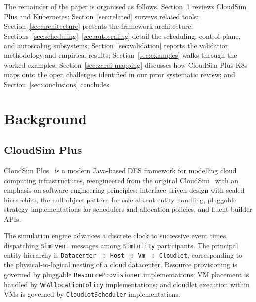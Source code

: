 \documentclass[ASNA,twocolumn]{USG}
\newcommand{\ckm}{CloudSim Plus-K8s\xspace}
\begin{document}
    The remainder of the paper is organised as follows.
    Section~\ref{sec:background} reviews CloudSim Plus and
    Kubernetes; Section~\ref{sec:related} surveys related tools;
    Section~\ref{sec:architecture} presents the framework architecture;
    Sections~\ref{sec:scheduling}--\ref{sec:autoscaling} detail the
    scheduling, control-plane, and autoscaling subsystems;
    Section~\ref{sec:validation} reports the validation methodology and
    empirical results; Section~\ref{sec:examples} walks through the worked
    examples; Section~\ref{sec:zarai-mapping} discusses how \ckm maps onto
    the open challenges identified in our prior systematic review; and
    Section~\ref{sec:conclusions} concludes.

    \section{Background}\label{sec:background}

    \subsection{CloudSim Plus}

    CloudSim Plus~\cite{Silva2017} is a modern Java-based DES framework
    for modelling cloud computing infrastructures, reengineered from the
    original CloudSim~\cite{Calheiros2011} with an emphasis on software
    engineering principles: interface-driven design with sealed hierarchies,
    the null-object pattern for safe absent-entity handling, pluggable
    strategy implementations for schedulers and allocation policies, and
    fluent builder APIs.

    The simulation engine advances a discrete clock to successive event
    times, dispatching \texttt{SimEvent} messages among \texttt{SimEntity}
    participants. The principal entity hierarchy is \texttt{Datacenter}
    $\supset$ \texttt{Host} $\supset$ \texttt{Vm} $\supset$ \texttt{Cloudlet},
    corresponding to the physical-to-logical nesting of a cloud datacenter.
    Resource provisioning is governed by pluggable \texttt{ResourceProvisioner}
    implementations; VM placement is handled by \texttt{VmAllocationPolicy}
    implementations; and cloudlet execution within VMs is governed by
    \texttt{CloudletScheduler} implementations.
\end{document}
